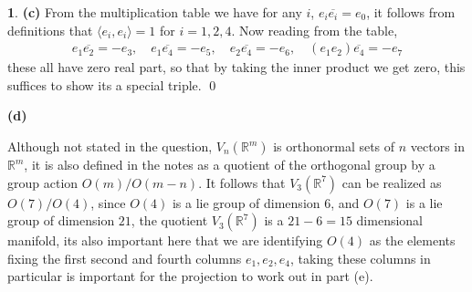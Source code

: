 \documentclass[10.5pt]{article}
\theoremstyle{definition}
\newtheorem{pb}{}
\newcommand{\gen}[1]{\langle#1\rangle}
\begin{document}
\begin{pb}
        \textbf{(c)} From the multiplication table we have for any \(i\), \(e_i \overline{e_i} = e_0\), it follows from definitions that \(\gen{e_i,e_i} = 1\) for \(i = 1,2,4\). Now reading from the table,
        \begin{align*}
            e_1 \overline{e_2} = -e_3, \quad e_1 \overline{e_4} = - e_5, \quad e_2 \overline{e_4} = -e_6, \quad (e_1e_2)\overline{e_4} = -e_7
        \end{align*}
        these all have zero real part, so that by taking the inner product we get zero, this suffices to show its a special triple. \qed

        \textbf{(d)} 
        
        Although not stated in the question, \(V_n(\mathbb{R}^m)\) is orthonormal sets of \(n\) vectors in \(\mathbb{R}^m\), it is also defined in the notes as a quotient of the orthogonal group by a group action \(O(m)/O(m-n)\). It follows that \(V_3(\mathbb{R}^7)\) can be realized as \(O(7)/O(4)\), since \(O(4)\) is a lie group of dimension \(6\), and \(O(7)\) is a lie group of dimension \(21\), the quotient \(V_3(\mathbb{R}^7)\) is a \(21 - 6 = 15\) dimensional manifold, its also important here that we are identifying \(O(4)\) as the elements fixing the first second and fourth columns \(e_1,e_2,e_4\), taking these columns in particular is important for the projection to work out in part (e).


\end{pb}
\end{document}
